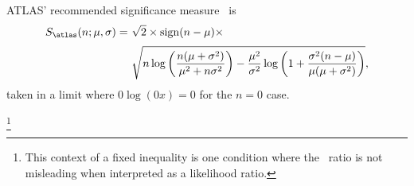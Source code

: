 ATLAS' recommended significance measure~\cite{atlas_significance} is
\begin{align}
\label{eqn:significance_atlas}
S_\mathrm{\atlas}(n; \mu, \sigma) =~&
\sqrt{2} \times
\mathrm{sign}(n - \mu) \times
\\[0.2em] \nonumber
&
\sqrt{
n\log\left(\frac{n(\mu + \sigma^2)}{\mu^2 + n\sigma^2}\right)
- \frac{\mu^2}{\sigma^2}\log\left(
1 + \frac{\sigma^2(n - \mu)}{\mu(\mu + \sigma^2)}
\right)
}
,
\end{align}
taken in a limit where $0\log(0x) = 0$ for the $n=0$ case.


%
\footnote{%
This context of a fixed inequality is one condition where the
\pvalue\ ratio is not misleading when interpreted as a likelihood ratio.%
}
